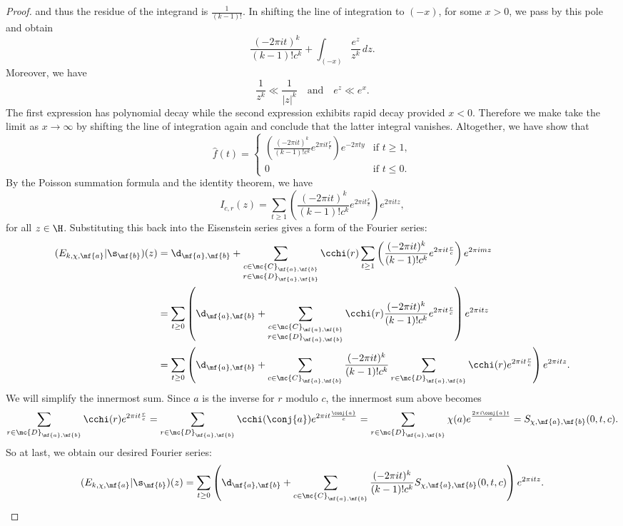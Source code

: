 \begin{proof}
      and thus the residue of the integrand is $\frac{1}{(k-1)!}$. In shifting the line of integration to $(-x)$, for some $x > 0$, we pass by this pole and obtain
      \[
        \frac{(-2\pi it)^{k}}{(k-1)!c^{k}}+\int_{(-x)}\frac{e^{z}}{z^{k}}\,dz.
      \]
      Moreover, we have
      \[
        \frac{1}{z^{k}} \ll \frac{1}{|z|^{k}} \quad \text{and} \quad e^{z} \ll e^{x}.
      \]
      The first expression has polynomial decay while the second expression exhibits rapid decay provided $x < 0$. Therefore we make take the limit as $x \to \infty$ by shifting the line of integration again and conclude that the latter integral vanishes. Altogether, we have show that
      \[
        \hat{f}(t) = \begin{cases} \left(\frac{(-2\pi it)^{k}}{(k-1)!c^{k}}e^{2\pi it\frac{r}{c}}\right)e^{-2\pi ty} & \text{if $t \ge 1$}, \\ 0 & \text{if $t \le 0$}. \end{cases}
      \]
      By the Poisson summation formula and the identity theorem, we have
      \[
        I_{c,r}(z) = \sum_{t \ge 1}\left(\frac{(-2\pi it)^{k}}{(k-1)!c^{k}}e^{2\pi it\frac{r}{c}}\right)e^{2\pi itz},
      \]
      for all $z \in \H$. Substituting this back into the Eisenstein series gives a form of the Fourier series:
      \begin{align*}
        (E_{k,\chi,\mf{a}}|\s_{\mf{b}})(z) &= \d_{\mf{a},\mf{b}}+\sum_{\substack{c \in \mc{C}_{\mf{a},\mf{b}} \\ r \in \mc{D}_{\mf{a},\mf{b}}}}\cchi(r)\sum_{t \ge 1}\left(\frac{(-2\pi it)^{k}}{(k-1)!c^{k}}e^{2\pi it\frac{r}{c}}\right)e^{2\pi imz} \\
        &= \sum_{t \ge 0}\left(\d_{\mf{a},\mf{b}}+\sum_{\substack{c \in \mc{C}_{\mf{a},\mf{b}} \\ r \in \mc{D}_{\mf{a},\mf{b}}}}\cchi(r)\frac{(-2\pi it)^{k}}{(k-1)!c^{k}}e^{2\pi it\frac{r}{c}}\right)e^{2\pi itz} \\
        &= \sum_{t \ge 0}\left(\d_{\mf{a},\mf{b}}+\sum_{\substack{c \in \mc{C}_{\mf{a},\mf{b}}}}\frac{(-2\pi it)^{k}}{(k-1)!c^{k}}\sum_{r \in \mc{D}_{\mf{a},\mf{b}}}\cchi(r)e^{2\pi it\frac{r}{c}}\right)e^{2\pi itz}.
      \end{align*}
      We will simplify the innermost sum. Since $a$ is the inverse for $r$ modulo $c$, the innermost sum above becomes
      \[
        \sum_{r \in \mc{D}_{\mf{a},\mf{b}}}\cchi(r)e^{2\pi it\frac{r}{c}} = \sum_{r \in \mc{D}_{\mf{a},\mf{b}}}\cchi(\conj{a})e^{2\pi it\frac{\conj{a}}{c}} = \sum_{r \in \mc{D}_{\mf{a},\mf{b}}}\chi(a)e^{\frac{2\pi i\conj{a}t}{c}} = S_{\chi,\mf{a},\mf{b}}(0,t,c).
      \]
      So at last, we obtain our desired Fourier series:
      \[
        (E_{k,\chi,\mf{a}}|\s_{\mf{b}})(z) = \sum_{t \ge 0}\left(\d_{\mf{a},\mf{b}}+\sum_{\substack{c \in \mc{C}_{\mf{a},\mf{b}}}}\frac{(-2\pi it)^{k}}{(k-1)!c^{k}}S_{\chi,\mf{a},\mf{b}}(0,t,c)\right)e^{2\pi itz}.
      \]
    \end{proof}

